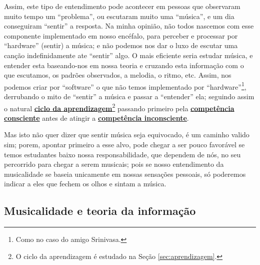 Assim, este tipo de entendimento  pode acontecer em pessoas que observaram muito tempo um ``problema'', 
ou escutaram muito uma ``música'', 
e um dia conseguiram ``sentir'' a resposta. 
Na minha opinião, 
não todos nascemos com esse componente implementado em nosso encéfalo, para perceber e processar por ``hardware'' (sentir) a música; 
e não podemos nos dar o luxo de escutar uma canção indefinidamente ate ``sentir'' algo. 
O mais eficiente seria estudar música, 
e entender esta baseando-nos em nossa teoria e cruzando esta informação com o que escutamos,
os padrões observados, a melodia, o ritmo, etc. 
Assim, nos podemos criar por ``software'' o que não temos implementado por ``hardware''\footnote{Como no caso do amigo Srinivasa.}, 
derrubando o mito de ``sentir'' a música e passar a ``entender'' ela;
seguindo assim o natural \hyperref[sec:aprendizagem]{\textbf{ciclo da aprendizagem}}\footnote{O
ciclo da aprendizagem é estudado na Seção \ref{sec:aprendizagem}.} passando primeiro pela 
\hyperref[ref:CompetenciaConsciente]{\textbf{competência consciente}} 
antes de atingir a  \hyperref[ref:CompetenciaInconsciente]{\textbf{competência inconsciente}}.

Mas isto não quer dizer que sentir música seja equivocado, é um caminho valido sim;
porem, apontar primeiro a esse alvo, 
pode chegar a ser pouco favorável se temos estudantes baixo nossa responsabilidade,
 que dependem de nós, no seu percorrido para chegar a serem musicais; 
pois se nosso entendimento da musicalidade se baseia unicamente em nossas sensações pessoais,
só poderemos indicar a eles que fechem os olhos e sintam a música.


\subsection{Musicalidade e teoria da informação}



